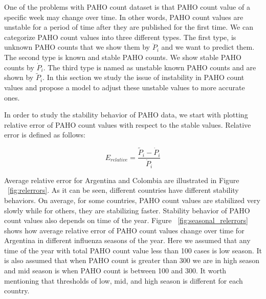 
One of the problems with PAHO count dataset is that PAHO count value of a specific week may change over time. In other words, PAHO count values are unstable for a period of time after they are published for the first time. We can categorize PAHO count values into three different types. The first type, is unknown PAHO counts that we show them by $\ddot{P}_i$ and we want to predict them. The second type is known and stable PAHO counts. We show stable PAHO counts by $\dot{P}_i$. The third type is named as unstable known PAHO counts and are shown by $\tilde{P}_i$. In this section we study the issue of instability in PAHO count values and propose a model to adjust these unstable values to more accurate ones.

In order to study the stability behavior of PAHO data, we start with plotting relative error of PAHO count values with respect to the stable values. Relative error is defined as follows:

\begin{equation}
E_{relative} = \frac{\tilde{P}_i - \dot{P}_i}{\dot{P}_i}
\end{equation}

Average relative error for Argentina and Colombia are illustrated in Figure ~\ref{fig:relerrors}. As it can be seen, different countries have different stability behaviors. On average, for some countries, PAHO count values are stabilized very slowly while for others, they are stabilizing faster. Stability behavior of PAHO count values also depends on time of the year. Figure ~\ref{fig:seasonal_relerrors} shows how average relative error of PAHO count values change over time for Argentina in different influenza seasons of the year. Here we assumed that any time of the year with total PAHO count value less than 100 cases is low season. It is also assumed that when PAHO count is greater than 300 we are in high season and mid season is when PAHO count is between 100 and 300. It worth mentioning that thresholds of low, mid, and high season is different for each country.

